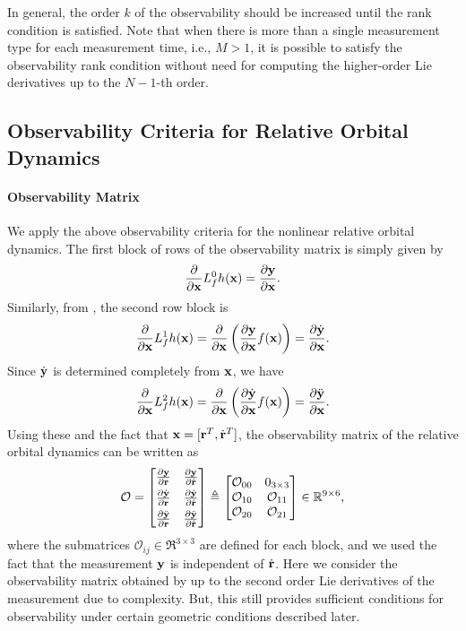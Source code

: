 In general, the order $k$ of the observability should be increased until the rank condition is satisfied. Note that when there is more than a single measurement type for each measurement time, i.e., $M>1$, it is possible to satisfy the observability rank condition without need for computing the higher-order Lie derivatives up to the $N-1$-th order.

\subsection{Observability Criteria for Relative Orbital Dynamics}

\paragraph{Observability Matrix}
We apply the above observability criteria for the nonlinear relative orbital dynamics. The first block of rows of the observability matrix is simply given by
\begin{align*}
\frac{\partial }{\partial \mathbf{x}} L_f^0 h(\mathbf{x}) = \frac{\partial \mathbf{y}}{\partial \mathbf{x}}.
\end{align*} 
Similarly, from , the second row block is
\begin{align*}
\frac{\partial }{\partial \mathbf{x}} L_f^1 h(\mathbf{x}) = \frac{\partial }{\partial \mathbf{x}}\left( \frac{\partial \mathbf{y}}{\partial \mathbf{x}}f(\mathbf{x}) \right)=\frac{\partial \dot{\mathbf{y}}}{\partial \mathbf{x}}.
\end{align*} 
Since $\dot{\mathbf{y}}$ is determined completely from $\mathbf{x}$, we have
\begin{align*}
\frac{\partial }{\partial \mathbf{x}} L_f^2 h(\mathbf{x}) = \frac{\partial }{\partial \mathbf{x}}\left( \frac{\partial \dot{\mathbf{y}}}{\partial \mathbf{x}}f(\mathbf{x}) \right)=\frac{\partial \ddot{\mathbf{y}}}{\partial \mathbf{x}}.
\end{align*}
Using these and the fact that $\mathbf{x}=[\mathbf{r}^T,\dot {\mathbf{r}}^T]$, the observability matrix of the relative orbital dynamics can be written as
\begin{align}
\mathcal{O} =
\begin{bmatrix}
\frac{\partial \mathbf{y}}{\partial \mathbf{r}} & \frac{\partial \mathbf{y}}{\partial \dot{\mathbf{r}}}\\[0.4em]
\frac{\partial \dot{\mathbf{y}}}{\partial \mathbf{r}} & \frac{\partial \dot{\mathbf{y}}}{\partial \dot{\mathbf{r}}}\\[0.4em]
\frac{\partial \ddot{\mathbf{y}}}{\partial \mathbf{r}} & \frac{\partial \ddot{\mathbf{y}}}{\partial \dot{\mathbf{r}}}
\end{bmatrix}
\triangleq
\begin{bmatrix}
\mathcal{O}_{00} & 0_{3\times 3}\\
\mathcal{O}_{10} & \mathcal{O}_{11}\\
\mathcal{O}_{20} & \mathcal{O}_{21}
\end{bmatrix}\in\mathbb{R}^{9\times 6},\label{eqn:OO}
\end{align}
where the submatrices $\mathcal{O}_{ij}\in\Re^{3\times 3}$ are defined for each block, and we used the fact that the measurement $\mathbf{y}$ is independent of $\dot{\mathbf{r}}$. Here we consider the observability matrix obtained by up to the second order Lie derivatives of the measurement due to complexity. But, this still provides sufficient conditions for observability under certain geometric conditions described later.

